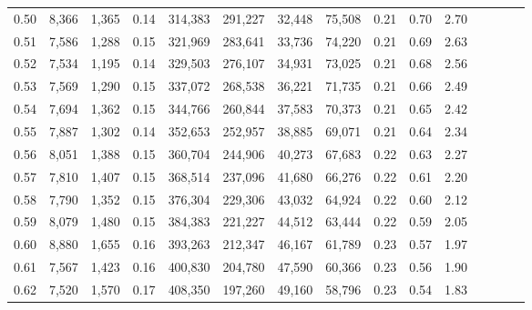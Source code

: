 \begin{tabular}{rrrcrrrrrrrrrrr}
0.50 &   8,366 &   1,365 &                                       0.14 &  314,383 &  291,227 &   32,448 &   75,508 &  0.21 &  0.70 &                         2.70 \\
0.51 &   7,586 &   1,288 &                                       0.15 &  321,969 &  283,641 &   33,736 &   74,220 &  0.21 &  0.69 &                         2.63 \\
0.52 &   7,534 &   1,195 &                                       0.14 &  329,503 &  276,107 &   34,931 &   73,025 &  0.21 &  0.68 &                         2.56 \\
0.53 &   7,569 &   1,290 &                                       0.15 &  337,072 &  268,538 &   36,221 &   71,735 &  0.21 &  0.66 &                         2.49 \\
0.54 &   7,694 &   1,362 &                                       0.15 &  344,766 &  260,844 &   37,583 &   70,373 &  0.21 &  0.65 &                         2.42 \\
0.55 &   7,887 &   1,302 &                                       0.14 &  352,653 &  252,957 &   38,885 &   69,071 &  0.21 &  0.64 &                         2.34 \\
0.56 &   8,051 &   1,388 &                                       0.15 &  360,704 &  244,906 &   40,273 &   67,683 &  0.22 &  0.63 &                         2.27 \\
0.57 &   7,810 &   1,407 &                                       0.15 &  368,514 &  237,096 &   41,680 &   66,276 &  0.22 &  0.61 &                         2.20 \\
0.58 &   7,790 &   1,352 &                                       0.15 &  376,304 &  229,306 &   43,032 &   64,924 &  0.22 &  0.60 &                         2.12 \\
0.59 &   8,079 &   1,480 &                                       0.15 &  384,383 &  221,227 &   44,512 &   63,444 &  0.22 &  0.59 &                         2.05 \\
0.60 &   8,880 &   1,655 &                                       0.16 &  393,263 &  212,347 &   46,167 &   61,789 &  0.23 &  0.57 &                         1.97 \\
0.61 &   7,567 &   1,423 &                                       0.16 &  400,830 &  204,780 &   47,590 &   60,366 &  0.23 &  0.56 &                         1.90 \\
0.62 &   7,520 &   1,570 &                                       0.17 &  408,350 &  197,260 &   49,160 &   58,796 &  0.23 &  0.54 &                         1.83 \\

\end{tabular}
